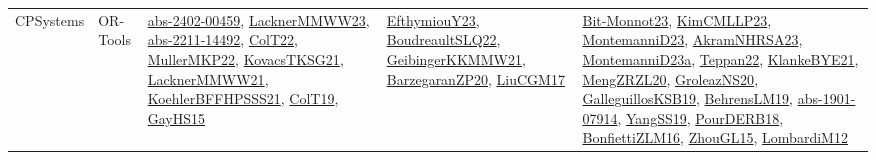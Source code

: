 {\begin{longtable}{lp{3cm}>{\raggedright}p{6cm}>{\raggedright}p{6cm}p{8cm}}
CPSystems & OR-Tools & \href{articles/abs-2402-00459.pdf}{abs-2402-00459}\cite{abs-2402-00459}, \href{articles/LacknerMMWW23.pdf}{LacknerMMWW23}\cite{LacknerMMWW23}, \href{articles/abs-2211-14492.pdf}{abs-2211-14492}\cite{abs-2211-14492}, \href{articles/ColT22.pdf}{ColT22}\cite{ColT22}, \href{articles/MullerMKP22.pdf}{MullerMKP22}\cite{MullerMKP22}, \href{papers/KovacsTKSG21.pdf}{KovacsTKSG21}\cite{KovacsTKSG21}, \href{papers/LacknerMMWW21.pdf}{LacknerMMWW21}\cite{LacknerMMWW21}, \href{articles/KoehlerBFFHPSSS21.pdf}{KoehlerBFFHPSSS21}\cite{KoehlerBFFHPSSS21}, \href{papers/ColT19.pdf}{ColT19}\cite{ColT19}, \href{papers/GayHS15.pdf}{GayHS15}\cite{GayHS15} & \href{papers/EfthymiouY23.pdf}{EfthymiouY23}\cite{EfthymiouY23}, \href{papers/BoudreaultSLQ22.pdf}{BoudreaultSLQ22}\cite{BoudreaultSLQ22}, \href{papers/GeibingerKKMMW21.pdf}{GeibingerKKMMW21}\cite{GeibingerKKMMW21}, \href{papers/BarzegaranZP20.pdf}{BarzegaranZP20}\cite{BarzegaranZP20}, \href{papers/LiuCGM17.pdf}{LiuCGM17}\cite{LiuCGM17} & \href{papers/Bit-Monnot23.pdf}{Bit-Monnot23}\cite{Bit-Monnot23}, \href{papers/KimCMLLP23.pdf}{KimCMLLP23}\cite{KimCMLLP23}, \href{articles/MontemanniD23.pdf}{MontemanniD23}\cite{MontemanniD23}, \href{articles/AkramNHRSA23.pdf}{AkramNHRSA23}\cite{AkramNHRSA23}, \href{articles/MontemanniD23a.pdf}{MontemanniD23a}\cite{MontemanniD23a}, \href{papers/Teppan22.pdf}{Teppan22}\cite{Teppan22}, \href{papers/KlankeBYE21.pdf}{KlankeBYE21}\cite{KlankeBYE21}, \href{articles/MengZRZL20.pdf}{MengZRZL20}\cite{MengZRZL20}, \href{papers/GroleazNS20.pdf}{GroleazNS20}\cite{GroleazNS20}, \href{papers/GalleguillosKSB19.pdf}{GalleguillosKSB19}\cite{GalleguillosKSB19}, \href{papers/BehrensLM19.pdf}{BehrensLM19}\cite{BehrensLM19}, \href{articles/abs-1901-07914.pdf}{abs-1901-07914}\cite{abs-1901-07914}, \href{papers/YangSS19.pdf}{YangSS19}\cite{YangSS19}, \href{articles/PourDERB18.pdf}{PourDERB18}\cite{PourDERB18}, \href{papers/BonfiettiZLM16.pdf}{BonfiettiZLM16}\cite{BonfiettiZLM16}, \href{papers/ZhouGL15.pdf}{ZhouGL15}\cite{ZhouGL15}, \href{articles/LombardiM12.pdf}{LombardiM12}\cite{LombardiM12}\\

\end{longtable}}
